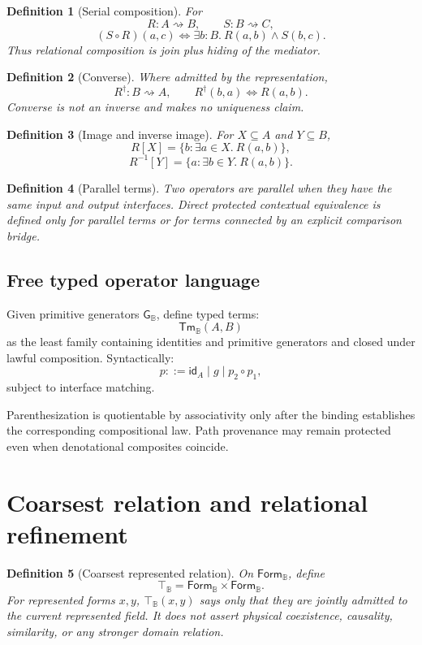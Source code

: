 \documentclass[11pt,oneside]{article}
\newtheorem{definition}{Definition}[section]
\newcommand{\B}{\mathbb B}
\begin{document}
\begin{definition}[Serial composition]
For
\[
R:A\rightsquigarrow B,\qquad S:B\rightsquigarrow C,
\]
\[
\boxed{
(S\circ R)(a,c)
\iff
\exists b:B.\ R(a,b)\land S(b,c).
}
\]
Thus relational composition is join plus hiding of the mediator.
\end{definition}

\begin{definition}[Converse]
Where admitted by the representation,
\[
R^\dagger:B\rightsquigarrow A,
\qquad
R^\dagger(b,a)\iff R(a,b).
\]
Converse is not an inverse and makes no uniqueness claim.
\end{definition}

\begin{definition}[Image and inverse image]
For \(X\subseteq A\) and \(Y\subseteq B\),
\[
R[X]=\{b:\exists a\in X.\ R(a,b)\},
\]
\[
R^{-1}[Y]=\{a:\exists b\in Y.\ R(a,b)\}.
\]
\end{definition}

\begin{definition}[Parallel terms]
Two operators are parallel when they have the same input and output interfaces.  Direct protected contextual equivalence is defined only for parallel terms or for terms connected by an explicit comparison bridge.
\end{definition}

\subsection{Free typed operator language}

Given primitive generators \(\mathsf G_{\B}\), define typed terms:
\[
\mathsf{Tm}_{\B}(A,B)
\]
as the least family containing identities and primitive generators and closed under lawful composition.  Syntactically:
\[
p ::= \mathsf{id}_A \mid g \mid p_2\circ p_1,
\]
subject to interface matching.

Parenthesization is quotientable by associativity only after the binding establishes the corresponding compositional law.  Path provenance may remain protected even when denotational composites coincide.


\section{Coarsest relation and relational refinement}

\begin{definition}[Coarsest represented relation]
On \(\mathsf{Form}_{\B}\), define
\[
\boxed{
\top_{\B}
=
\mathsf{Form}_{\B}\times\mathsf{Form}_{\B}.
}
\]
For represented forms \(x,y\), \(\top_{\B}(x,y)\) says only that they are jointly admitted to the current represented field.  It does not assert physical coexistence, causality, similarity, or any stronger domain relation.
\end{definition}
\end{document}
